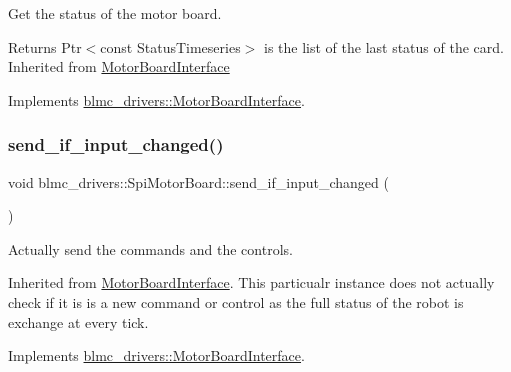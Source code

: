 Get the status of the motor board. 

\begin{DoxyReturn}{Returns}
Ptr$<$const Status\+Timeseries$>$ is the list of the last status of the card. Inherited from \hyperlink{classblmc__drivers_1_1MotorBoardInterface}{Motor\+Board\+Interface} 
\end{DoxyReturn}


Implements \hyperlink{classblmc__drivers_1_1MotorBoardInterface_a13b1ffa7d10c1c753d76eaf5368714e3}{blmc\+\_\+drivers\+::\+Motor\+Board\+Interface}.

\mbox{\label{classblmc__drivers_1_1SpiMotorBoard_a39e986b4df42867f8d5896c35c7c4464}} 
\subsubsection{\texorpdfstring{send\+\_\+if\+\_\+input\+\_\+changed()}{send\_if\_input\_changed()}}
{\footnotesize\ttfamily void blmc\+\_\+drivers\+::\+Spi\+Motor\+Board\+::send\+\_\+if\+\_\+input\+\_\+changed (\begin{DoxyParamCaption}{ }\end{DoxyParamCaption})\hspace{0.3cm}{\ttfamily [virtual]}}



Actually send the commands and the controls. 

Inherited from \hyperlink{classblmc__drivers_1_1MotorBoardInterface}{Motor\+Board\+Interface}. This particualr instance does not actually check if it is is a new command or control as the full status of the robot is exchange at every tick. 

Implements \hyperlink{classblmc__drivers_1_1MotorBoardInterface_a79afd172c736718868f4d269125f2581}{blmc\+\_\+drivers\+::\+Motor\+Board\+Interface}.

\mbox{\label{classblmc__drivers_1_1SpiMotorBoard_a6b626225af993444bdee397952281772}} 
